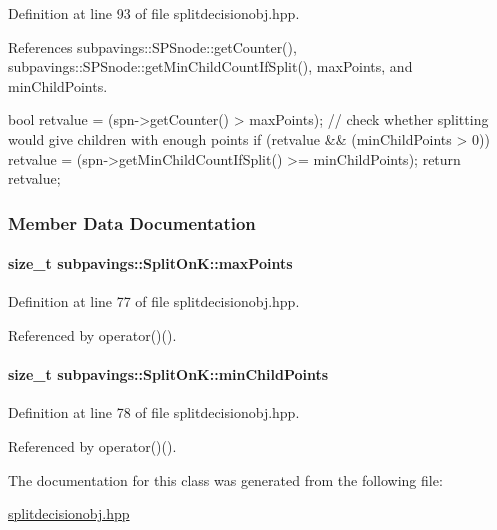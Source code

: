 \-Definition at line 93 of file splitdecisionobj.\-hpp.



\-References subpavings\-::\-S\-P\-Snode\-::get\-Counter(), subpavings\-::\-S\-P\-Snode\-::get\-Min\-Child\-Count\-If\-Split(), max\-Points, and min\-Child\-Points.


\begin{DoxyCode}
        {
            bool retvalue = (spn->getCounter() > maxPoints);
            // check whether splitting would give children with enough points
            if (retvalue && (minChildPoints > 0)) {
                retvalue = (spn->getMinChildCountIfSplit() >= minChildPoints);
            }
            return retvalue;
        }
\end{DoxyCode}


\subsubsection{\-Member \-Data \-Documentation}
\hypertarget{classsubpavings_1_1SplitOnK_a533786f57332f2559181036557cce420}{
\paragraph[{max\-Points}]{\setlength{\rightskip}{0pt plus 5cm}size\-\_\-t {\bf subpavings\-::\-Split\-On\-K\-::max\-Points}}}\label{classsubpavings_1_1SplitOnK_a533786f57332f2559181036557cce420}


\-Definition at line 77 of file splitdecisionobj.\-hpp.



\-Referenced by operator()().

\hypertarget{classsubpavings_1_1SplitOnK_a98bdd69177334492bf80b2ba32d41123}{
\paragraph[{min\-Child\-Points}]{\setlength{\rightskip}{0pt plus 5cm}size\-\_\-t {\bf subpavings\-::\-Split\-On\-K\-::min\-Child\-Points}}}\label{classsubpavings_1_1SplitOnK_a98bdd69177334492bf80b2ba32d41123}


\-Definition at line 78 of file splitdecisionobj.\-hpp.



\-Referenced by operator()().



\-The documentation for this class was generated from the following file\-:\begin{DoxyCompactItemize}
\item 
\hyperlink{splitdecisionobj_8hpp}{splitdecisionobj.\-hpp}\end{DoxyCompactItemize}
